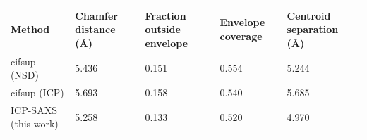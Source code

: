 \begin{tabular}{lllll}
\toprule
Method & Chamfer distance (Å) & Fraction outside envelope & Envelope coverage & Centroid separation (Å) \\
\midrule
cifsup (NSD) & 5.436 & 0.151 & 0.554 & 5.244 \\
cifsup (ICP) & 5.693 & 0.158 & 0.540 & 5.685 \\
ICP-SAXS (this work) & 5.258 & 0.133 & 0.520 & 4.970 \\
\bottomrule
\end{tabular}
